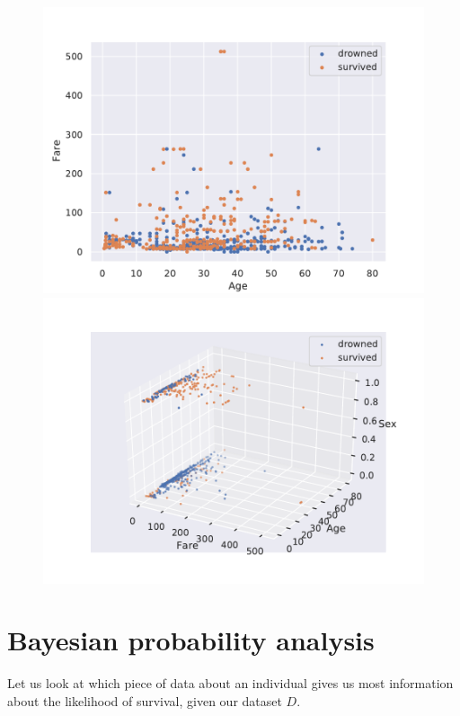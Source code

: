 \documentclass{book}
\begin{document}
\clearpage
\begin{figure}
    \centering
    \includegraphics[scale=.75]{../figs/scatter2d_Age_Fare.pdf}
    \includegraphics[scale=0.7]{../figs/scatter3d.pdf}%
\end{figure}



\clearpage
\section*{Bayesian probability analysis}
Let us look at which piece of data about an individual gives us most information 
about the likelihood of survival, given our dataset $D$.
\end{document}
